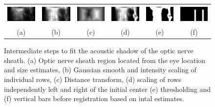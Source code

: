 \documentclass{llncs}
\begin{document}
\begin{figure}
\centering
\begin{tabular}{cccccc}
\includegraphics[height=0.36in]{019-nerve.png} &
\includegraphics[height=0.37in]{019-nerve-smooth.png} &
\includegraphics[height=0.36in]{019-nerve-distance.png} &
\includegraphics[height=0.36in]{019-nerve-scaled.png} &
\includegraphics[height=0.36in]{019-nerve-thres.png} &         
\includegraphics[height=0.36in]{019-nerve-moving.png} \\         
(a) & (b) & (c) & (d) & (e) & (f)
\end{tabular}
\caption{
\label{fig:algorithm-nerve}
Intermediate steps to fit the acoustic shadow of the optic nerve sheath. (a)
Optic nerve sheath region located from the eye location and size estimates, (b)
Gaussian smooth and intensity scaling of individual rows, (c) Distance
transform, (d) scaling of rows independently left and right of the initial
center (e) thresholding and (f) vertical bars before registration based on intal
estimates.
}
\end{figure}
\end{document}
